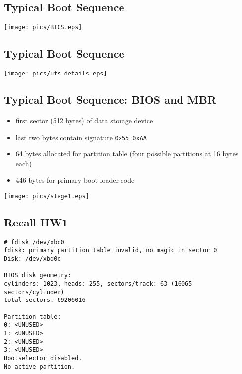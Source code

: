 \documentclass[xga]{xdvislides}
\begin{document}
\subsection{Typical Boot Sequence}
\vspace*{\fill}
\begin{center}
	\texttt{[image: pics/BIOS.eps]} \\
\end{center}
\vspace*{\fill}

\subsection{Typical Boot Sequence}
\vspace*{\fill}
\begin{center}
	\texttt{[image: pics/ufs-details.eps]} \\
\end{center}
\vspace*{\fill}

\subsection{Typical Boot Sequence: BIOS and MBR}
\begin{minipage}[c]{0.7\textwidth}
\begin{itemize}
	\item first sector (512 bytes) of data storage device
	\item last two bytes contain signature \verb+0x55 0xAA+
	\item 64 bytes allocated for partition table (four possible
		partitions at 16 bytes each)
	\item 446 bytes for primary boot loader code
\end{itemize}
\end{minipage}
\begin{minipage}[c]{0.1\textwidth}
\texttt{[image: pics/stage1.eps]} \\
\end{minipage}

\subsection{Recall HW1}
\begin{verbatim}
# fdisk /dev/xbd0
fdisk: primary partition table invalid, no magic in sector 0
Disk: /dev/xbd0d

BIOS disk geometry:
cylinders: 1023, heads: 255, sectors/track: 63 (16065 sectors/cylinder)
total sectors: 69206016

Partition table:
0: <UNUSED>
1: <UNUSED>
2: <UNUSED>
3: <UNUSED>
Bootselector disabled.
No active partition.
\end{verbatim}
\end{document}
